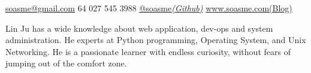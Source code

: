 \documentclass[10pt,a4paper]{article} %
\begin{document}


\noindent\href{mailto:soasme@gmail.com}{soasme@gmail.com}\bull
\textsmaller{+}64 027 545 3988\bull 
\href{https://github.com/soasme}{@soasme\textit{(Github)}}\bull
\href{http://www.soasme.com}{www.soasme.com(Blog)}\\ %
\spacedhrule{0.9em}{-0.4em} %



\vspace{-1.3em} %

\begin{multicols}{2}  %
  Lin Ju has a wide knowledge about web application, dev-ops and system administration. He experts at Python programming, Operating System, and Unix Networking. He is a passionate learner with endless curiosity, without fears of jumping out of the comfort zone.
\end{multicols}

\spacedhrule{0.5em}{-0.4em} %


\end{document}
